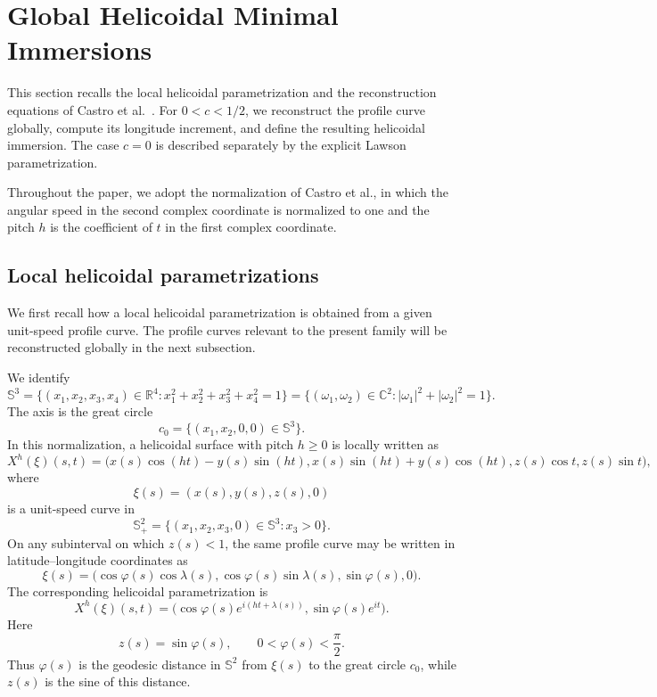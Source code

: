 \documentclass[a4paper,11pt]{amsart}
\numberwithin{equation}{section}
\theoremstyle{plain}
\begin{document}
\section{Global Helicoidal Minimal Immersions}
\label{sec:global_immersions}

This section recalls the local helicoidal parametrization and the
reconstruction equations of Castro et al.~\cite{Castro2024}. For
$0<c<1/2$, we reconstruct the profile curve globally, compute its longitude
increment, and define the resulting helicoidal immersion. The case $c=0$ is
described separately by the explicit Lawson parametrization.

Throughout the paper, we adopt the normalization of Castro et al., in which
the angular speed in the second complex coordinate is normalized to one and
the pitch $h$ is the coefficient of $t$ in the first complex coordinate.

\subsection{Local helicoidal parametrizations}

We first recall how a local helicoidal parametrization is obtained from
a given unit-speed profile curve. The profile curves relevant to the
present family will be reconstructed globally in the next subsection.

We identify
\[
\mathbb S^3
=
\{(x_1,x_2,x_3,x_4)\in\mathbb R^4:
x_1^2+x_2^2+x_3^2+x_4^2=1\}
=
\{(\omega_1,\omega_2)\in\mathbb C^2:
|\omega_1|^2+|\omega_2|^2=1\}.
\]
The axis is the great circle
\[
c_0=\{(x_1,x_2,0,0)\in\mathbb S^3\}.
\]
In this normalization, a helicoidal surface with pitch $h\geq0$ is locally
written as
\[
X^h(\xi)(s,t)
=
\bigl(
x(s)\cos(ht)-y(s)\sin(ht),
x(s)\sin(ht)+y(s)\cos(ht),
z(s)\cos t,
z(s)\sin t
\bigr),
\]
where
\[
\xi(s)=(x(s),y(s),z(s),0)
\]
is a unit-speed curve in
\[
\mathbb S^2_+
=
\{(x_1,x_2,x_3,0)\in\mathbb S^3:x_3>0\}.
\]
On any subinterval on which $z(s)<1$, the same profile curve may be
written in latitude--longitude coordinates as
\[
\xi(s)
=
\bigl(
\cos\varphi(s)\cos\lambda(s),
\cos\varphi(s)\sin\lambda(s),
\sin\varphi(s),
0
\bigr).
\]
The corresponding helicoidal parametrization is
\cite[Eq.~(2.4)]{Castro2024}
\begin{equation}\label{eq:castro_local_helicoidal_parametrization}
X^h(\xi)(s,t)
=
\bigl(
\cos\varphi(s)e^{i(ht+\lambda(s))},
\sin\varphi(s)e^{it}
\bigr).
\end{equation}
Here
\[
z(s)=\sin\varphi(s),
\qquad
0<\varphi(s)<\frac{\pi}{2}.
\]
Thus $\varphi(s)$ is the geodesic distance in $\mathbb S^2$ from
$\xi(s)$ to the great circle $c_0$, while $z(s)$ is the sine of this
distance. 
\end{document}
